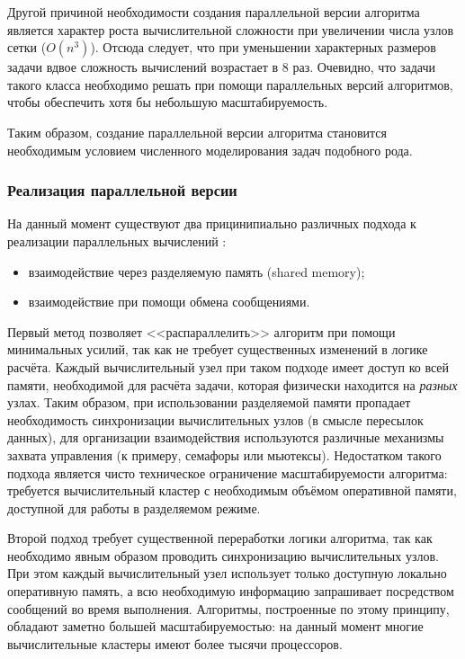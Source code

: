Другой причиной необходимости создания параллельной версии алгоритма является характер роста вычислительной сложности при увеличении числа узлов сетки ($O(n^3)$). Отсюда следует, что при уменьшении характерных размеров задачи вдвое сложность вычислений возрастает в 8 раз. Очевидно, что задачи такого класса необходимо решать при помощи параллельных версий алгоритмов, чтобы обеспечить хотя бы небольшую масштабируемость.

Таким образом, создание параллельной версии алгоритма становится необходимым условием численного моделирования задач подобного рода.

\subsubsection{Реализация параллельной версии}
На данный момент существуют два прицинипиально различных подхода к реализации параллельных вычислений \cite{gergel}:
\begin{itemize}
\item взаимодействие через разделяемую память (shared memory);
\item взаимодействие при помощи обмена сообщениями.
 \end{itemize}

Первый метод позволяет <<распараллелить>> алгоритм при помощи минимальных
усилий, так как не требует существенных изменений в логике расчёта. Каждый
вычислительный узел при таком подходе имеет доступ ко всей памяти, необходимой
для расчёта задачи, которая физически находится на \emph{разных} узлах. Таким
образом, при использовании разделяемой памяти пропадает необходимость
синхронизации вычислительных узлов (в смысле пересылок данных), для организации
взаимодействия используются различные механизмы захвата управления (к примеру,
семафоры или мьютексы). Недостатком такого подхода является чисто техническое
ограничение масштабируемости алгоритма: требуется вычислительный кластер с
необходимым объёмом оперативной памяти, доступной для работы в разделяемом
режиме.

Второй подход требует существенной переработки логики алгоритма, так как необходимо явным образом проводить синхронизацию вычислительных узлов. При этом каждый вычислительный узел использует только доступную локально оперативную память, а всю необходимую информацию запрашивает посредством сообщений во время выполнения. Алгоритмы, построенные по этому принципу, обладают заметно большей масштабируемостью: на данный момент многие вычислительные кластеры имеют более тысячи процессоров.

